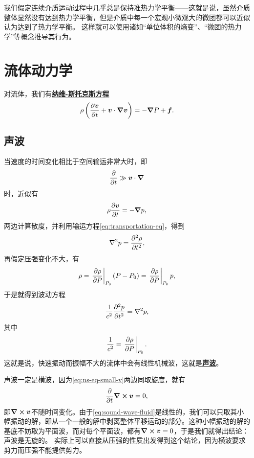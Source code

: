 \documentclass[hyperref, UTF8, a4paper]{ctexart}
\newcommand{\concept}[1]{\underline{\textbf{#1}}}
\begin{document}
我们假定连续介质运动过程中几乎总是保持准热力学平衡——这就是说，虽然介质整体显然没有达到热力学平衡，但是介质中每一个宏观小微观大的微团都可以近似认为达到了热力学平衡。
这样就可以使用诸如“单位体积的熵变”、“微团的热力学”等概念推导其行为。

\section{流体动力学}

对流体，我们有\concept{纳维-斯托克斯方程}
\begin{equation}
    \rho \left( \pdv{\vb*{v}}{t} + \vb*{v} \cdot \grad{\vb*{v}} \right) = - \grad{P} + \vb*{f}.
\end{equation}

\subsection{声波}

当速度的时间变化相比于空间输运非常大时，即
\[
    \pdv{t} \gg \vb*{v} \cdot \grad
\]
时，近似有
\begin{equation}
    \rho \pdv{\vb*{v}}{t} = - \grad{p},
    \label{eq:ns-eq-small-v}
\end{equation}
两边计算散度，并利用输运方程\eqref{eq:transportation-eq}，得到
\[
    \laplacian{p} = \pdv[2]{\rho}{t},
\]
再假定压强变化不大，有
\[
    \rho = \eval{\pdv{\rho}{P}}_{P_0} (P - P_0) = \eval{\pdv{\rho}{P}}_{P_0} p,
\]
于是就得到波动方程
\begin{equation}
    \frac{1}{c^2} \pdv[2]{p}{t} = \laplacian{p},
    \label{eq:sound-wave-fluid}
\end{equation}
其中
\begin{equation}
    \frac{1}{c^2} = \eval{\pdv{\rho}{P}}_{P_0}.
\end{equation}
这就是说，快速振动而振幅不大的流体中会有线性机械波，这就是\concept{声波}。

声波一定是横波，因为\eqref{eq:ns-eq-small-v}两边同取旋度，就有
\[
    \pdv{t} \curl{\vb*{v}} = 0, 
\]
即$\curl{\vb*{v}}$不随时间变化。由于\eqref{eq:sound-wave-fluid}是线性的，我们可以只取其小幅振动的解，即从一个一般的解中剥离整体平移运动的部分。这种小幅振动的解的基底不妨取为平面波，而对每个平面波，都有$\curl{\vb*{v}}=0$，于是我们就得出结论：声波是无旋的。
实际上可以直接从压强的性质出发得到这个结论，因为横波要求剪力而压强不能提供剪力。
\end{document}
